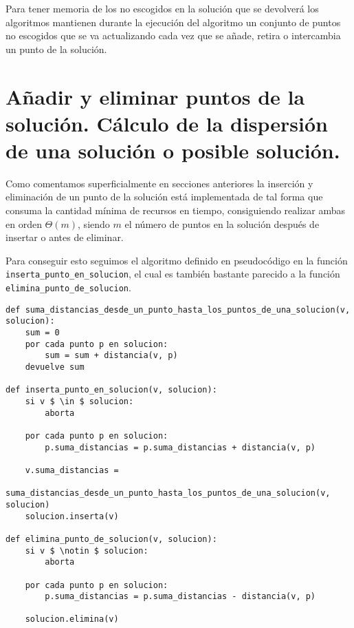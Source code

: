 Para tener memoria de los no escogidos en la solución que se devolverá los algoritmos mantienen durante la ejecución del algoritmo un
conjunto de puntos no escogidos que se va actualizando cada vez que se añade, retira o intercambia un punto de la solución.

\section{Añadir y eliminar puntos de la solución. Cálculo de la dispersión de una solución o posible solución.}

Como comentamos superficialmente en secciones anteriores la inserción y eliminación de un punto de la solución está implementada de tal
forma que consuma la cantidad mínima de recursos en tiempo, consiguiendo realizar ambas en orden $ \Theta(m) $, siendo $ m $ el 
número de puntos en la solución después de insertar o antes de eliminar.

Para conseguir esto seguimos el algoritmo definido en pseudocódigo en la función \texttt{inserta\_punto\_en\_solucion}, el cual es también bastante parecido
a la función \texttt{elimina\_punto\_de\_solucion}.

\begin{minipage}{\textwidth}
\begin{lstlisting}[mathescape=true,caption={Definición en pseudocódigo de las funciones que permiten añadir y eliminar puntos a una solución.},captionpos=b]
def suma_distancias_desde_un_punto_hasta_los_puntos_de_una_solucion(v, solucion):
    sum = 0
    por cada punto p en solucion:
        sum = sum + distancia(v, p)
    devuelve sum

def inserta_punto_en_solucion(v, solucion):
    si v $ \in $ solucion:
        aborta

    por cada punto p en solucion:
        p.suma_distancias = p.suma_distancias + distancia(v, p)
    
    v.suma_distancias =
        suma_distancias_desde_un_punto_hasta_los_puntos_de_una_solucion(v, solucion)
    solucion.inserta(v)

def elimina_punto_de_solucion(v, solucion):
    si v $ \notin $ solucion:
        aborta
    
    por cada punto p en solucion:
        p.suma_distancias = p.suma_distancias - distancia(v, p)
    
    solucion.elimina(v)
\end{lstlisting}
\end{minipage}

